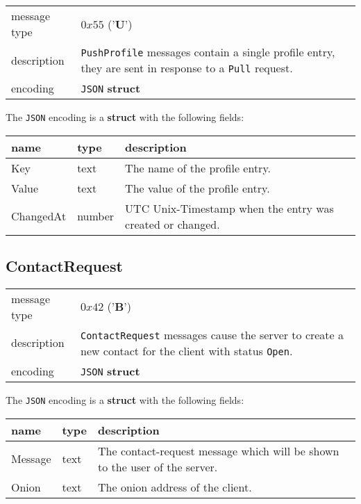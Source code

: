 \documentclass[12pt]{article}
\begin{document}
\begin{tabular}{ l p{} }
\hline
message type & $0x55$ ('\textbf{U}') \\
description & \texttt{PushProfile} messages contain a single profile entry, they are sent in response to a \texttt{Pull} request. \\
encoding & \texttt{JSON} \textbf{struct} \\\hline
\end{tabular}

The \texttt{JSON} encoding is a \textbf{struct} with the following fields:

\begin{tabular}{|l|l|p{}|}
\hline
name & type & description \\\hline\hline
Key         & text   & The name of the profile entry. \\\hline
Value       & text   & The value of the profile entry. \\\hline
ChangedAt   & number & UTC Unix-Timestamp when the entry was created or changed. \\\hline
\end{tabular}

\subsection*{ContactRequest}

\begin{tabular}{l p{}}
\hline
message type & $0x42$ ('\textbf{B}') \\
description & \texttt{ContactRequest} messages cause the server to create a new contact for the client with status \texttt{Open}. \\
encoding & \texttt{JSON} \textbf{struct} \\\hline
\end{tabular}

The \texttt{JSON} encoding is a \textbf{struct} with the following fields:

\begin{tabular}{|l|l|p{}|}
\hline
name & type & description \\\hline\hline
Message   & text & The contact-request message which will be shown to the user of the server. \\\hline
Onion     & text & The onion address of the client. \\\hline
\end{tabular}
\end{document}
